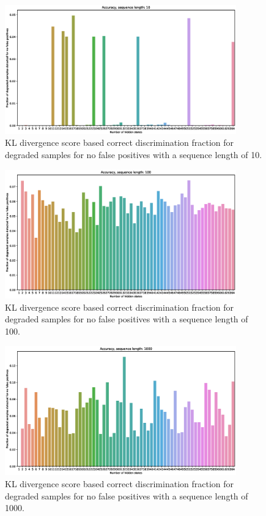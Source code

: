 \documentclass[journal]{IEEEtran}
\begin{document}
\begin{figure}[h]
 \centering
 \includegraphics[width=10cm,keepaspectratio=true]{./accuracy_10.eps}
 \caption{KL divergence score based correct discrimination fraction for degraded samples for no false positives with a sequence length of 10.}
 \label{figure:discrimination_rate_10}
\end{figure}

\begin{figure}[h]
 \centering
 \includegraphics[width=10cm,keepaspectratio=true]{./accuracy_100.eps}
 \caption{KL divergence score based correct discrimination fraction for degraded samples for no false positives with a sequence length of 100.}
 \label{figure:discrimination_rate_100}
\end{figure}

\begin{figure}[h]
 \centering
 \includegraphics[width=10cm,keepaspectratio=true]{./accuracy_1000.eps}
 \caption{KL divergence score based correct discrimination fraction for degraded samples for no false positives with a sequence length of 1000.}
 \label{figure:discrimination_rate_1000}
\end{figure}
\end{document}
